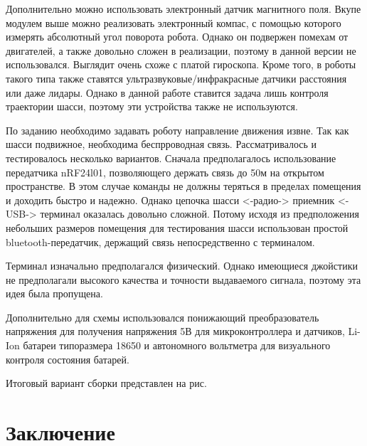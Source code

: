 \documentclass[14pt,a4paper,russian]{scrartcl}
\begin{document}
Дополнительно можно использовать электронный датчик магнитного поля.
Вкупе модулем выше можно реализовать электронный компас, с помощью которого
измерять абсолютный угол поворота робота. Однако он подвержен помехам от 
двигателей, а также довольно сложен в реализации, поэтому в данной версии
не использовался. Выглядит очень схоже с платой гироскопа. Кроме того,
в роботы такого типа также ставятся ультразвуковые/инфракрасные датчики расстояния
или даже лидары. Однако в данной работе ставится задача лишь контроля
траектории шасси, поэтому эти устройства также не используются.

По заданию необходимо задавать роботу направление движения извне. Так как
шасси подвижное, необходима беспрроводная связь. Рассматривалось
и тестировалось несколько вариантов. Сначала предполагалось использование 
передатчика nRF24l01, позволяющего держать связь до 50м на открытом пространстве.
В этом случае команды не должны теряться в пределах помещения и доходить
быстро и надежно. Однако цепочка шасси <-радио-> приемник <-USB-> терминал
оказалась довольно сложной. Потому исходя из предположения небольших
размеров помещения для тестирования шасси использован простой bluetooth-передатчик,
держащий связь непосредственно с терминалом.

Терминал изначально предполагался физический. Однако имеющиеся джойстики
не предполагали высокого качества и точности выдаваемого сигнала, поэтому
эта идея была пропущена.

Дополнительно для схемы использовался понижающий преобразователь
напряжения для получения напряжения 5В для микроконтроллера и датчиков, 
Li-Ion батареи типоразмера 18650 и автономного вольтметра для 
визуального контроля состояния батарей.

Итоговый вариант сборки представлен на рис.

\section*{Заключение}

\newpage


\newpage
\end{document}
